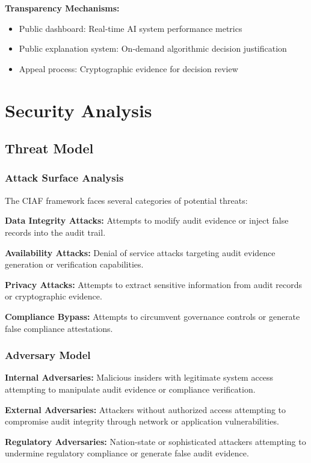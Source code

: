 \documentclass[12pt,a4paper]{article}
\begin{document}
\textbf{Transparency Mechanisms:}
\begin{itemize}
\item Public dashboard: Real-time AI system performance metrics
\item Public explanation system: On-demand algorithmic decision justification
\item Appeal process: Cryptographic evidence for decision review
\end{itemize}

\section{Security Analysis}

\subsection{Threat Model}

\subsubsection{Attack Surface Analysis}

The CIAF framework faces several categories of potential threats:

\textbf{Data Integrity Attacks:} Attempts to modify audit evidence or inject false records into the audit trail.

\textbf{Availability Attacks:} Denial of service attacks targeting audit evidence generation or verification capabilities.

\textbf{Privacy Attacks:} Attempts to extract sensitive information from audit records or cryptographic evidence.

\textbf{Compliance Bypass:} Attempts to circumvent governance controls or generate false compliance attestations.

\subsubsection{Adversary Model}

\textbf{Internal Adversaries:} Malicious insiders with legitimate system access attempting to manipulate audit evidence or compliance verification.

\textbf{External Adversaries:} Attackers without authorized access attempting to compromise audit integrity through network or application vulnerabilities.

\textbf{Regulatory Adversaries:} Nation-state or sophisticated attackers attempting to undermine regulatory compliance or generate false audit evidence.
\end{document}
